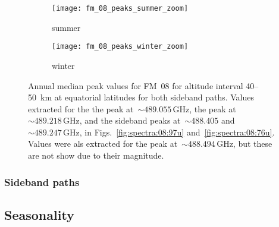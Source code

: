 \begin{figure}[ht]
    \centering
    \begin{subfigure}[b]{0.9545\textwidth}
        \texttt{[image: fm\_08\_peaks\_summer\_zoom]}
        \caption{summer}\label{fig:peaks:08:summer}
    \end{subfigure}
    \begin{subfigure}[b]{0.9545\textwidth}
        \texttt{[image: fm\_08\_peaks\_winter\_zoom]}
        \caption{winter}\label{fig:peaks:08:winter}
    \end{subfigure}
    \caption{Annual median peak values for FM~08 for altitude interval
        40--50~km at equatorial latitudes for both sideband paths.
        Values extracted for the the  peak
        at~$\sim489.055\,\mathrm{GHz}$, the  peak
        at~$\sim489.218\,\mathrm{GHz}$, and the  sideband peaks
        at~$\sim488.405$ and $\sim489.247\,\mathrm{GHz}$,
        in Figs.~\ref{fig:spectra:08:97u} and~\ref{fig:spectra:08:76u}.
        Values were als extracted for the  peak
        at~$\sim488.494\,\mathrm{GHz}$, but these are not show due to their
        magnitude.
        }\label{fig:peaks:08}
\end{figure}

\subsubsection{Sideband paths}

\subsection{Seasonality}

